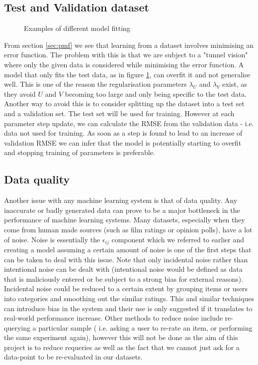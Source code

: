 \subsection{Test and Validation dataset}
\begin{figure}[!htbp]
  \begin{center} 
    \resizebox{\textwidth}{!}{}
    \caption{Examples of different model fitting}
    \label{fig:over_underfit}
  \end{center}
\end{figure}
From section \ref{sec:pmf} we see that learning from a dataset involves minimising an error function. The problem with this is that we are subject to a "tunnel vision" where only the given data is considered while minimising the error function. A model that only fits the test data, as in figure \ref{fig:over_underfit}, can overfit it and not generalise well. This is one of the reason the regularisation parameters $\lambda_U$ and $\lambda_V$ exist, as they avoid $U$ and $V$ becoming too large and only being specific to the test data. Another way to avoid this is to consider splitting up the dataset into a test set and a validation set. The test set will be used for training. However at each parameter step update, we can calculate the RMSE from the validation data - i.e. data not used for training. As soon as a step is found to lead to an increase of validation RMSE we can infer that the model is potentially starting to overfit and stopping training of parameters is preferable.

\subsection{Data quality}
Another issue with any machine learning system is that of data quality. Any inaccurate or badly generated data can prove to be a major bottleneck in the performance of machine learning systems. Many datasets, especially when they come from human made sources (such as film ratings or opinion polls), have a lot of noise. Noise is essentially the $\epsilon_{ij}$ component which we referred to earlier and creating a model assuming a certain amount of noise is one of the first steps that can be taken to deal with this issue. Note that only incidental noise rather than intentional noise can be dealt with (intentional noise would be defined as data that is maliciously entered or be subject to a strong bias for external reasons). Incidental noise could be reduced to a certain extent by grouping items or users into categories and smoothing out the similar ratings. This and similar techniques can introduce bias in the system and their use is only suggested if it translates to real-world performance increase. Other methods to reduce noise include re-querying a particular sample (\cite{toledo13} i.e. asking a user to re-rate an item, or performing the same experiment again), however this will not be done as the aim of this project is to reduce requeries as well as the fact that we cannot just ask for a data-point to be re-evaluated in our datasets.

